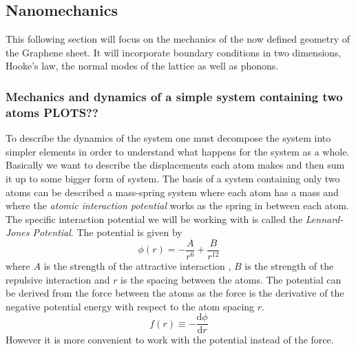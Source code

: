 
\subsection{Nanomechanics}
This following section will focus on the mechanics of the now defined geometry of the Graphene sheet. It will incorporate boundary conditions in two dimensions, Hooke's law, the normal modes of the lattice as well as phonons.
\subsubsection{Mechanics and dynamics of a simple system containing two atoms PLOTS??}
To describe the dynamics of the system one must decompose the system into simpler elements in order to understand what happens for the system as a whole. Basically we want to describe the displacements each atom makes and then sum it up to some bigger form of system. The basis of a system containing only two atoms can be described a mass-spring system where each atom has a mass and where the \textit{atomic interaction potential} works as the spring in between each atom. The specific interaction potential we will be working with is called the \textit{Lennard-Jones Potential}. The potential is given by \begin{equation}
    \phi(r)=-\dfrac{A}{r^{6}}+\dfrac{B}{r^{12}}\label{LJPot}
\end{equation} where $A$ is the strength of the attractive interaction , $B$ is the strength of the repulsive interaction and $r$ is the spacing between the atoms.
The potential can be derived from the force between the atoms as the force is the derivative of the negative potential energy with respect to the atom spacing $r$.\begin{equation}
    f(r)\equiv -\dfrac{\text{d}\phi}{\text{d}r}
\end{equation} However it is more convenient to work with the potential instead of the force. \\
